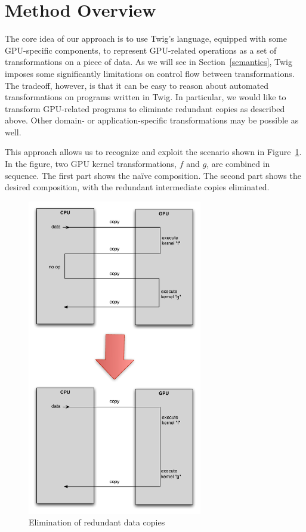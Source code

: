 
\section{Method Overview}

The core idea of our approach is to use Twig's language, equipped with some
GPU-specific components, to represent GPU-related operations as a set of
transformations on a piece of data. As we will see in Section~\ref{semantics},
Twig imposes some significantly limitations on control flow between
transformations. The tradeoff, however, is that it can be easy to reason about
automated transformations on programs written in Twig. In particular, we would
like to transform GPU-related programs to eliminate redundant copies as
described above. Other domain- or application-specific transformations may be
possible as well.

This approach allows us to recognize and exploit the scenario shown in
Figure~\ref{basic-idea}. In the figure, two GPU kernel transformations, $f$ and
$g$, are combined in sequence. The first part shows the na\"ive composition. The
second part shows the desired composition, with the redundant intermediate
copies eliminated.

\begin{figure}[ht]
\label{basic-idea}
\begin{center}
\includegraphics[width=3.0in]{images/basic-idea}
\caption{Elimination of redundant data copies}
\end{center}
\end{figure}

